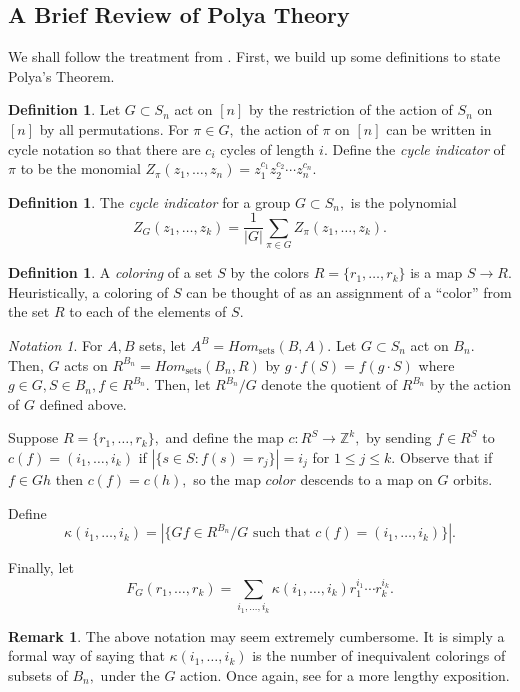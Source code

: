 \documentclass[10 pt]{amsart}
\theoremstyle{plain}
\theoremstyle{definition}
\newtheorem{defn}[thm]{Definition}
\newtheorem{rem}[thm]{Remark}
\theoremstyle{remark}
\newtheorem{note}[thm]{Notation}
\numberwithin{equation}{section}
\newcommand\ssec{\subsection}
\newcommand\BBZ{{\mathbb Z}}
\begin{document}
\ssec{A Brief Review of Polya Theory}

We shall follow the treatment from \cite[Chapter 7]{algebraic_stanley}. First, we build up some definitions to state Polya's Theorem.

\begin{defn}
Let $G \subset S_n$ act on $[n]$ by the restriction of the action of $S_n$ on $[n]$ by all permutations. For $\pi \in G,$ the action of $\pi$ on $[n]$ can be written in cycle notation so that there are $c_i$ cycles of length $i.$ Define the {\it cycle indicator} of $\pi$ to be the monomial $Z_\pi(z_1,\ldots, z_n) = z_1^{c_1}z_2^{c_2}\cdots z_n^{c_n}.$
\end{defn}

\begin{defn}
The {\it cycle indicator} for a group $G \subset S_n,$ is the polynomial $$Z_G(z_1,\ldots, z_k) = \frac{1}{|G|}\sum_{\pi \in G} Z_\pi(z_1,\ldots, z_k).$$
\end{defn}

\begin{defn}
A {\it coloring} of a set $S$ by the colors $R = \{r_1,\ldots, r_k\}$ is a map $S \rightarrow R.$ Heuristically, a coloring of $S$ can be thought of as an assignment of a ``color'' from the set $R$ to each of the elements of $S.$
\end{defn}

\begin{note}
For $A,B$ sets, let $A^B = Hom_{\text{sets}}(B,A).$ Let $G \subset S_n$ act on $B_n.$ Then, $G$ acts on $R^{B_n} = Hom_{\text{sets}}(B_n,R)$ by $g \cdot f(S) = f(g\cdot S)$ where $g \in G,S \in B_n, f \in R^{B_n}.$ Then, let $R^{B_n}/G$ denote the quotient of $R^{B_n}$ by the action of $G$ defined above.

Suppose $R = \{r_1,\ldots, r_k\},$ and define the map $c:R^{S}\rightarrow \BBZ^k,$ by sending $f \in R^S$ to $c(f) = (i_1,\ldots, i_k)$ if $|\{s \in S:f(s) = r_j\}| = i_j$ for $1 \leq j \leq k.$ Observe that if $f \in Gh$ then $c(f) = c(h),$ so the map $color$ descends to a map on $G$ orbits.

Define $$\kappa(i_1,\ldots, i_k) = |\{Gf \in R^{B_n}/G \text{ such that } c(f) = (i_1,\ldots, i_k) \}|.$$

Finally, let 
$$F_G(r_1,\ldots, r_k) = \sum_{i_1,\ldots, i_k} \kappa(i_1,\ldots, i_k)r_1^{i_1} \cdots r_k^{i_k}.$$
\end{note}

\begin{rem}
The above notation may seem extremely cumbersome. It is simply a formal way of saying that $\kappa(i_1,\ldots, i_k)$ is the number of inequivalent colorings of subsets of $B_n,$ under the $G$ action. Once again, see \cite[Chapter 7]{algebraic_stanley} for a more lengthy exposition.
\end{rem}
\end{document}
